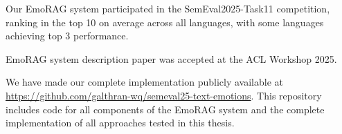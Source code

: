 \documentclass[a4paper,12pt]{extarticle}
\begin{document}
Our EmoRAG system participated in the SemEval2025-Task11 competition, ranking in the top 10 on average across all languages, with some languages achieving top 3 performance. 

EmoRAG system description paper was accepted at the ACL Workshop 2025.

We have made our complete implementation publicly available at \url{https://github.com/galthran-wq/semeval25-text-emotions}. This repository includes code for all components of the EmoRAG system and the complete implementation of all approaches tested in this thesis.

\printbibliography

\appendix





\end{document}
